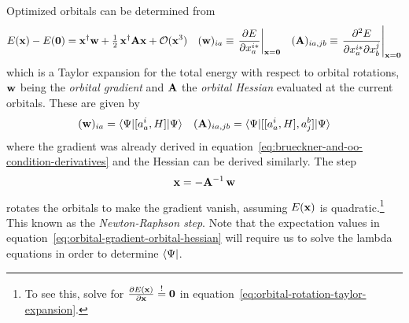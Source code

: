 \documentclass[11pt]{article}
\numberwithin{equation}{section}
\begin{document}
\begin{rmk}
\label{rmk:orbital-newton-raphson}
Optimized orbitals can be determined from
\begin{align}
\label{eq:orbital-rotation-taylor-expansion}
  E(\mathbf{x})
-
  E(\mathbf{0})
=
  \mathbf{x}^\dagger
  \mathbf{w}
+
  \tfrac{1}{2}\,
  \mathbf{x}^\dagger
  \mathbf{A}
  \mathbf{x}
+
  \mathcal{O}(\mathbf{x}^3)
&&
  (\mathbf{w})_{ia}
\equiv
  \left.
  \frac {\partial E}{\partial x_a^{i*}}
  \right|_{\mathbf{x}=\mathbf{0}}
&&
  (\mathbf{A})_{ia,jb}
\equiv
  \left.
  \frac {\partial^2 E}{\partial x_a^{i*}\partial x_b^j}
  \right|_{\mathbf{x}=\mathbf{0}}
\end{align}
which is a Taylor expansion for the total energy with respect to orbital rotations, $\mathbf{w}$ being the \textit{orbital gradient} and $\mathbf{A}$ the \textit{orbital Hessian} evaluated at the current orbitals.
These are given by
\begin{align}
\label{eq:orbital-gradient-orbital-hessian}
  (\mathbf{w})_{ia}
=
  \langle\Psi |
    [a^i_a, H]
  |\Psi \rangle
&&
  (\mathbf{A})_{ia,jb}
=
  \langle\Psi |
    [[a^i_a, H], a^b_j]
  |\Psi \rangle
\end{align}
where the gradient was already derived in equation~\ref{eq:brueckner-and-oo-condition-derivatives} and the Hessian can be derived similarly.
The step
\begin{align}
  \mathbf{x}
=
-
  \mathbf{A}^{-1}\,
  \mathbf{w}
\end{align}
rotates the orbitals to make the gradient vanish, assuming $E(\mathbf{x})$ is quadratic.\footnote{To see this, solve for $\frac {\partial E(\mathbf{x})}{\partial\mathbf{x}}\overset{!}{=}\mathbf{0}$ in equation~\ref{eq:orbital-rotation-taylor-expansion}.}
This known as the \textit{Newton-Raphson step}.
Note that the expectation values in equation~\ref{eq:orbital-gradient-orbital-hessian} will require us to solve the lambda equations in order to determine $\langle\Psi |$.
\end{rmk}
\end{document}
